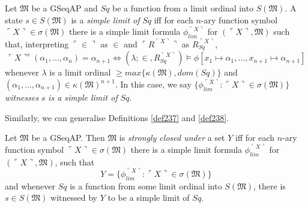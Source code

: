 \documentclass[12pt]{article}
\numberwithin{equation}{section}
\begin{document}
\begin{defi}\label{def256}
Let $\mathfrak{M}$ be a GSeqAP and $Sq$ be a function from a limit ordinal into $S(\mathfrak{M})$. A state $s \in S(\mathfrak{M})$ is a \emph{simple limit of} $Sq$ iff for each $n$-ary function symbol $\ulcorner X \urcorner \in \sigma(\mathfrak{M})$ there is a simple limit formula $\phi_{lim}^{\ulcorner X \urcorner}$ for $(\ulcorner X \urcorner, \mathfrak{M})$ such that, interpreting $\ulcorner \in \urcorner$ as $\in$ and $\ulcorner R^{\ulcorner X \urcorner} \urcorner$ as $R_{Sq}^{\ulcorner X \urcorner}$, 
\begin{equation*}
    \ulcorner X \urcorner^s (\alpha_1, \dots, \alpha_n) = \alpha_{n+1} \iff (\lambda; \in, R_{Sq}^{\ulcorner X \urcorner}) \models \phi[x_1 \mapsto \alpha_1, \dots, x_{n+1} \mapsto \alpha_{n+1}]
\end{equation*}
whenever $\lambda$ is a limit ordinal $\geq max\{\kappa(\mathfrak{M}), dom(Sq)\}$ and $(\alpha_1, \dots, \alpha_{n+1}) \in \kappa(\mathfrak{M})^{n+1}$. In this case, we say $\{\phi_{lim}^{\ulcorner X \urcorner} : \ulcorner X \urcorner \in \sigma(\mathfrak{M})\}$ \emph{witnesses} $s$ \emph{is a simple limit of} $Sq$.
\end{defi}

Similarly, we can generalise Definitions \ref{def237} and \ref{def238}.

\begin{defi}\label{def257p}
Let $\mathfrak{M}$ be a GSeqAP. Then $\mathfrak{M}$ is \emph{strongly closed under} a set $Y$ iff for each $n$-ary function symbol $\ulcorner X \urcorner \in \sigma(\mathfrak{M})$ there is a simple limit formula $\phi_{lim}^{\ulcorner X \urcorner}$ for $(\ulcorner X \urcorner, \mathfrak{M})$, such that 
\begin{equation*}
    Y = \{\phi_{lim}^{\ulcorner X \urcorner} : \ulcorner X \urcorner \in \sigma(\mathfrak{M})\}
\end{equation*}
and whenever $Sq$ is a function from some limit ordinal into $S(\mathfrak{M})$, there is $s \in S(\mathfrak{M})$ witnessed by $Y$ to be a simple limit of $Sq$.
\end{defi}
\end{document}
